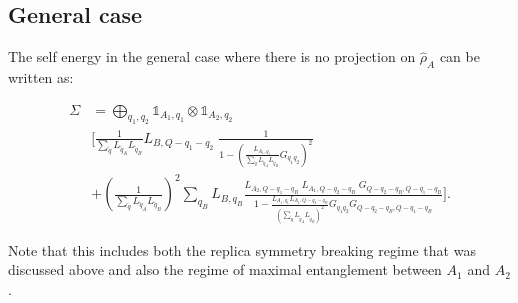 \documentclass[aps,pra,reprint,superscriptaddress,twocolumn,notitlepage]{revtex4-1}
\numberwithin{equation}{section}
\begin{document}
\subsection{General case}
The self energy in the general case where there is no projection on $\hat\rho_A$ can be written as:
\begin{widetext}
\begin{equation}
\begin{aligned}
    \Sigma &= \bigoplus_{q_1, q_2} \mathbb{1}_{A_1,q_1} \otimes \mathbb{1}_{A_2,q_2} \\
    & \bigg[ \frac{1}{\sum_{\tilde{q}} L_{\tilde{q}_A}  L_{\tilde{q}_B  }}    L_{B, Q - q_1 - q_2}     \; \frac{1}{1-\left( \frac{L_{A_1,q_1}}{\sum_{\tilde{q}} L_{\tilde{q}_A}  L_{\tilde{q}_B  }} G_{q_1q_2} \right)^2}\\
    &+ \left(\frac{1}{\sum_{\tilde{q}} L_{\tilde{q}_A}  L_{\tilde{q}_B  } } \right)^2  \sum_{q_B} L_{B,q_B} 
    \frac{ L_{A_2,Q - q_1 - q_B } \; L_{A_1, Q - q_2 - q_B } \; G_{Q - q_2- q_B , Q -  q_1 - q_B } }
    {1 - \frac{L_{A_1,q_1} L_{A_1, Q - q_2 - q_B} }
    {\left( \sum_{\tilde{q}} L_{\tilde{q}_A}  L_{\tilde{q}_B  } \right)^2}
    G_{q_1q_2}  G_{Q -  q_2 -  q_B , Q -  q_1  - q_B }  }  \bigg].
\end{aligned}    
\end{equation}
\end{widetext}
Note that this includes both the replica symmetry breaking regime that was discussed above and also the regime of maximal entanglement between $A_1$ and $A_2$.




\end{document}
